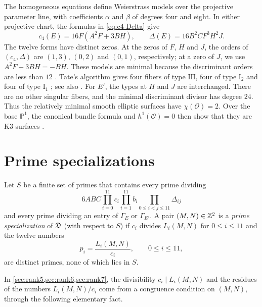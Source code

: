 \begin{remark}\label{rem:elliptic-surfaces}
The homogeneous equations define Weierstrass models over the projective parameter line, with coefficients $\alpha$ and $\beta$ of degrees four and eight. In either projective chart, the formulas in \eqref{eq:c4-Delta} give
\[
c_4(E)=16F(A^2F+3BH),\qquad \Delta(E)=16B^2CF^3H^2J.
\]
The twelve forms have distinct zeros. At the zeros of $F$, $H$ and $J$, the orders of $(c_4,\Delta)$ are $(1,3)$, $(0,2)$ and $(0,1)$, respectively; at a zero of $J$, we use $A^2F+3BH=-BH$. These models are minimal because the discriminant orders are less than $12$ \cite[p.~40, Remark~1]{Tate1975}. Tate's algorithm gives four fibers of type $\mathrm{III}$, four of type $\mathrm I_2$ and four of type $\mathrm I_1$ \cite[p.~34]{Tate1975}; see also \cite[\S4.5, Table~1]{SchuttShioda2010}. For $E'$, the types at $H$ and $J$ are interchanged. There are no other singular fibers, and the minimal discriminant divisor has degree $24$. Thus the relatively minimal smooth elliptic surfaces have $\chi(\mathcal O)=2$. Over the base $\mathbb P^1$, the canonical bundle formula and $h^1(\mathcal O)=0$ then show that they are K3 surfaces \cite[Theorems~6.8 and~6.12 and \S8.2]{SchuttShioda2010}.
\end{remark}

\section{Prime specializations}\label{sec:families-prime}

\begin{definition}\label{def:prime-specialization}
Let $S$ be a finite set of primes that contains every prime dividing
\begin{equation}\label{eq:S-condition}
6ABC\prod_{i=0}^{11}c_i\prod_{i=1}^{11}b_i\prod_{0\le i<j\le11}\Delta_{ij}
\end{equation}
and every prime dividing an entry of $\Gamma_E$ or $\Gamma_{E'}$. A pair $(M,N)\in\mathbb Z^2$ is a \emph{prime specialization} of $\mathfrak D$ (with respect to $S$) if $c_i$ divides $L_i(M,N)$ for $0\le i\le11$ and the twelve numbers
\begin{equation}\label{eq:prime-values}
p_i=\frac{L_i(M,N)}{c_i},\qquad0\le i\le11,
\end{equation}
are distinct primes, none of which lies in $S$.
\end{definition}

In \cref{sec:rank5,sec:rank6,sec:rank7}, the divisibility $c_i\mid L_i(M,N)$ and the residues of the numbers $L_i(M,N)/c_i$ come from a congruence condition on $(M,N)$, through the following elementary fact.

